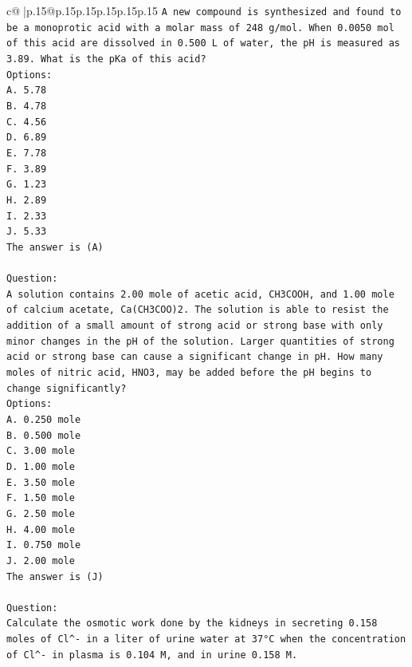 \documentclass{article}
\begin{document}
{\begin{supertabular}{c@{$\;$}|p{.15\linewidth}@{}p{.15\linewidth}p{.15\linewidth}p{.15\linewidth}p{.15\linewidth}p{.15\linewidth}}
{{{\texttt{A new compound is synthesized and found to be a monoprotic acid with a molar mass of 248 g/mol. When 0.0050 mol of this acid are dissolved in 0.500 L of water, the pH is measured as 3.89. What is the pKa of this acid?} \\
\texttt{Options:} \\
\texttt{A. 5.78} \\
\texttt{B. 4.78} \\
\texttt{C. 4.56} \\
\texttt{D. 6.89} \\
\texttt{E. 7.78} \\
\texttt{F. 3.89} \\
\texttt{G. 1.23} \\
\texttt{H. 2.89} \\
\texttt{I. 2.33} \\
\texttt{J. 5.33} \\
\texttt{The answer is (A)} \\
\\ 
\texttt{Question:} \\
\texttt{A solution contains 2.00 mole of acetic acid, CH3COOH, and 1.00 mole of calcium acetate, Ca(CH3COO)2. The solution is able to resist the addition of a small amount of strong acid or strong base with only minor changes in the pH of the solution. Larger quantities of strong acid or strong base can cause a significant change in pH. How many moles of nitric acid, HNO3, may be added before the pH begins to change significantly?} \\
\texttt{Options:} \\
\texttt{A. 0.250 mole} \\
\texttt{B. 0.500 mole} \\
\texttt{C. 3.00 mole} \\
\texttt{D. 1.00 mole} \\
\texttt{E. 3.50 mole} \\
\texttt{F. 1.50 mole} \\
\texttt{G. 2.50 mole} \\
\texttt{H. 4.00 mole} \\
\texttt{I. 0.750 mole} \\
\texttt{J. 2.00 mole} \\
\texttt{The answer is (J)} \\
\\ 
\texttt{Question:} \\
\texttt{Calculate the osmotic work done by the kidneys in secreting 0.158 moles of Cl\^{}{-} in a liter of urine water at 37°C when the concentration of Cl\^{}{-} in plasma is 0.104 M, and in urine 0.158 M.} \\
}}}
\end{supertabular}}
\end{document}
